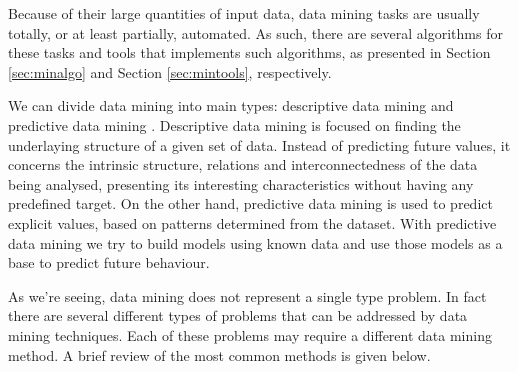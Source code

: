 Because of their large quantities of input data, data mining tasks are usually
totally, or at least partially, automated. As such, there are several algorithms
for these tasks and tools that implements such algorithms, as presented in
Section \ref{sec:minalgo} and Section \ref{sec:mintools}, respectively.

We can divide data mining into main types: descriptive data mining and
predictive data mining \cite{Fayyad1996}. Descriptive data mining is focused on
finding the underlaying structure of a given set of data. Instead of predicting
future values, it concerns the intrinsic structure, relations and
interconnectedness of the data being analysed, presenting its interesting
characteristics without having any predefined target. On the other hand,
predictive data mining is used to predict explicit values, based on patterns
determined from the dataset. With predictive data mining we try to build models
using known data and use those models as a base to predict future behaviour.

As we're seeing, data mining does not represent a single type problem. In fact
there are several different types of problems that can be addressed by data
mining techniques. Each of these problems may require a different data mining
method. A brief review of the most common methods is given below.

